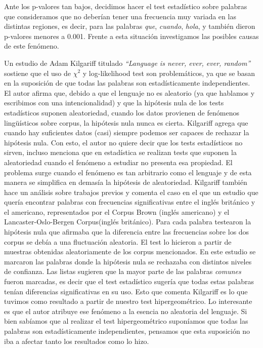 Ante los p-valores tan bajos, decidimos hacer el test estadístico sobre palabras que consideramos que no deberían tener una frecuencia muy variada en las distintas regiones, es decir, para las palabras \textit{que}, \textit{cuando}, \textit{hola}, y también dieron p-valores menores a 0.001. Frente a esta situación investigamos las posibles causas de este fenómeno.

Un estudio de Adam Kilgariff titulado \textit{``Language is never, ever, ever, random''}\cite {kilgarriff2005language} sostiene que el uso de ${\chi}^2$ y log-likelihood test son problemáticos, ya que se basan en la suposición de que todas las palabras son estadísticamente independientes. 
El autor afirma que, debido a que el lenguaje no es aleatorio (ya que hablamos y escribimos con una intencionalidad) y que la hipótesis nula de los tests estadísticos suponen aleatoriedad, cuando los datos provienen de fenómenos lingüísticos sobre corpus, la hipótesis nula nunca es cierta. 
Kilgariff agrega que cuando hay suficientes datos (casi) siempre podemos ser capaces de rechazar la hipótesis nula. Con esto, el autor no quiere decir que los tests estadísticos no sirven, incluso menciona que en estadística se realizan tests que suponen la aleatoriedad cuando el fenómeno a estudiar no presenta esa propiedad. El problema surge cuando el fenómeno es tan arbitrario como el lenguaje y de esta manera se simplifica en demasía la hipótesis de aleatoriedad.
Kilgariff también hace un análisis sobre trabajos previos y comenta el caso en el que un estudio que quería encontrar palabras con frecuencias significativas entre el inglés británico y el americano, representados por el Corpus Brown (inglés americano) y el Lancaster-Oslo-Bergen Corpus(inglés británico). Para cada palabra testearon la hipótesis nula que afirmaba que la diferencia entre las frecuencias sobre los dos corpus se debía a una fluctuación  aleatoria. El test lo hicieron a partir de muestras obtenidas aleatoriamente de los corpus mencionados. En este estudio se marcaron las palabras donde la hipótesis nula se rechazaba con distintos niveles de confianza. Las listas sugieren que la mayor parte de las palabras \textit{comunes} fueron marcadas, es decir que el test estadístico sugería que todas estas palabras tenían diferencias significativas en su uso. Esto que comenta Kilgariff es lo que tuvimos como resultado a partir de nuestro test hipergeométrico. Lo interesante es que el autor atribuye ese fenómeno a la esencia no aleatoria del lenguaje. Si bien sabíamos que al realizar el test hipergeométrico suponíamos que todas las palabras son estadísticamente independientes, pensamos que esta suposición no iba a afectar tanto los resultados como lo hizo.

